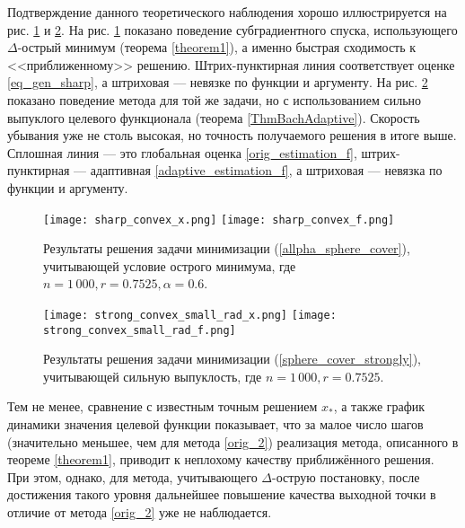     Подтверждение данного теоретического наблюдения хорошо иллюстрируется на рис. \ref{res_sharp_convex} и \ref{res_strong_convex}. На рис. \ref{res_sharp_convex} показано поведение субградиентного спуска, использующего $\Delta$-острый минимум (теорема \ref{theorem1}), а именно  быстрая сходимость к <<приближенному>> решению. Штрих-пунктирная линия соответствует оценке \eqref{eq_gen_sharp}, а штриховая --- невязке по функции и аргументу. На рис. \ref{res_strong_convex} показано поведение метода для той же задачи, но с использованием сильно выпуклого целевого функционала (теорема \ref{ThmBachAdaptive}). Скорость убывания уже не столь высокая, но точность получаемого решения в итоге выше. Сплошная линия --- это глобальная оценка \eqref{orig_estimation_f}, штрих-пунктирная --- адаптивная \eqref{adaptive_estimation_f}, а штриховая --- невязка по функции и аргументу.

    \begin{figure}[h]
        \texttt{[image: sharp\_convex\_x.png]}
        \endminipage\hfill
        \texttt{[image: sharp\_convex\_f.png]}
        \endminipage\hfill
        \caption{ Результаты решения задачи минимизации (\ref{allpha_sphere_cover}), учитывающей условие острого минимума, где  $n= 1\,000, r = 0.7525, \alpha = 0.6$.}
        \label{res_sharp_convex}
    \end{figure}

    \begin{figure}[h]
        \texttt{[image: strong\_convex\_small\_rad\_x.png]}
        \endminipage\hfill
        \texttt{[image: strong\_convex\_small\_rad\_f.png]}
        \endminipage\hfill
        \caption{ Результаты решения задачи минимизации (\ref{sphere_cover_strongly}), учитывающей сильную выпуклость, где  $n= 1\,000, r = 0.7525$.}
        \label{res_strong_convex}
    \end{figure}

    Тем не менее, сравнение с известным точным решением $x_*$, а также график динамики значения целевой функции показывает, что за малое число шагов (значительно меньшее, чем для метода \eqref{orig_2}) реализация метода, описанного в теореме \ref{theorem1}, приводит к неплохому качеству приближённого решения. При этом, однако, для метода, учитывающего $\Delta$-острую постановку, после достижения такого уровня дальнейшее повышение качества выходной точки в отличие от метода \eqref{orig_2} уже не наблюдается. 

